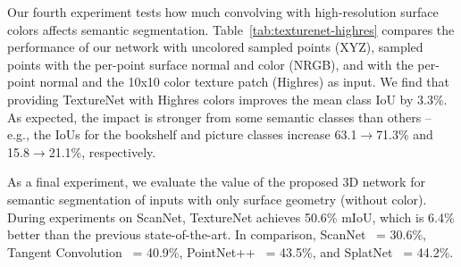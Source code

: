 Our fourth experiment tests how much convolving with high-resolution surface colors affects semantic segmentation.   Table~\ref{tab:texturenet-highres} compares the performance of our network with uncolored sampled points (XYZ), sampled points with the per-point surface normal and color (NRGB), and with the per-point normal and the 10x10 color texture patch (Highres) as input.   We find that providing TextureNet with Highres colors improves the mean class IoU by 3.3\%.  As expected, the impact is stronger from some semantic classes than others -- e.g., the IoUs for the bookshelf and picture classes increase 63.1$\rightarrow$71.3\% and 15.8$\rightarrow$21.1\%, respectively. %


As a final experiment, we evaluate the value of the proposed 3D network for semantic segmentation of inputs with only surface geometry (without color).  During experiments on ScanNet, TextureNet achieves 50.6\% mIoU, which is 6.4\% better than the previous state-of-the-art.   In comparison, ScanNet~\cite{dai2017scannet} = 30.6\%, Tangent Convolution~\cite{tatarchenko2018tangent} = 40.9\%, PointNet++~\cite{qi2017pointnet++} = 43.5\%, and SplatNet~\cite{su2018splatnet} = 44.2\%.  %
